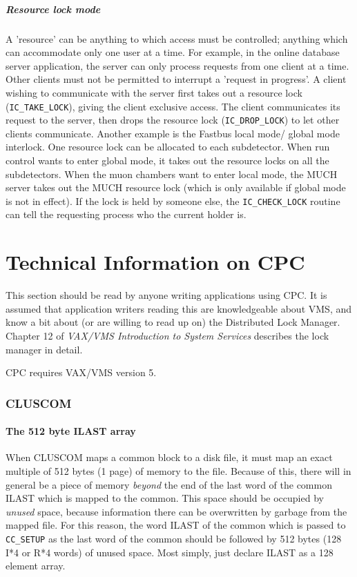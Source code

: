 \subsubsection{Resource lock mode}
A 'resource' can be anything to which access must be controlled; anything
which can accommodate only one user at a time. For example, in the online
database server application, the server can only process requests from one
client at a time. Other clients must not be permitted to interrupt a
'request in progress'. A client wishing to communicate with the server first
takes out a resource lock (\verb|IC_TAKE_LOCK|),
giving the client exclusive access. The client
communicates its request to the server, then drops the resource lock
(\verb|IC_DROP_LOCK|) to
let other clients communicate. Another example is the Fastbus local mode/
global mode interlock. One resource lock can be allocated to each subdetector.
When run control wants to enter global mode, it takes out the resource locks
on all the subdetectors. When the muon chambers want to enter local mode,
the MUCH server takes out the MUCH resource lock (which is only available
if global mode is not in effect). If the lock is held by someone else, the
\verb|IC_CHECK_LOCK| routine can tell the requesting process who the current
holder is.

\newpage
\part{Technical Information on CPC}

This section should be read by anyone writing applications using CPC.
It is assumed that application writers reading this
are knowledgeable about VMS,
and know a bit about (or are willing to read up on) the
Distributed Lock Manager. Chapter 12 of {\sl VAX/VMS Introduction to
System Services} describes the lock manager in detail.

CPC requires VAX/VMS version 5.

\section{CLUSCOM}

\subsection{The 512 byte ILAST array}
When CLUSCOM maps a common block to a disk file, it must map an exact
multiple of 512 bytes (1 page) of memory to the file. Because of this,
there will in general be a piece of memory {\em beyond\/} the end of the last
word of the common ILAST which is mapped to the common. This space
should be occupied by {\em unused\/} space, because information there can be
overwritten by garbage from the mapped file. For this reason, the word
ILAST of the common which is passed to \verb|CC_SETUP| as the last word of
the common should be followed by 512 bytes (128 I*4 or R*4 words) of
unused space. Most simply, just declare ILAST as a 128 element array.

